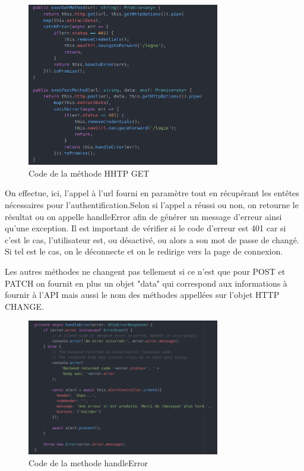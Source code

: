 				\begin{figure}[H]
					\centering\includegraphics[width=0.75\textwidth, keepaspectratio]{res/ionic-rest-execmethod.png}
					\caption{Code de la méthode HHTP GET}
				\end{figure}

				On effectue, ici, l'appel à l'url fourni en paramètre tout en récupérant les entêtes nécessaires pour l'authentification.Selon si l'appel a réussi ou non, on retourne le résultat ou on appelle handleError afin de générer un message d'erreur ainsi qu'une exception. Il est important de vérifier si le code d'erreur est 401 car si c'est le cas, l'utilisateur est, ou désactivé, ou alors a son mot de passe de changé. Si tel est le cas, on le déconnecte et on le redirige vers la page de connexion.

				Les autres méthodes ne changent pas tellement si ce n'est que pour POST et PATCH on fournit en plus un objet "data" qui correspond aux informations à fournir à l'API mais aussi le nom des méthodes appellées sur l'objet HTTP CHANGE.

				\begin{figure}[H]
					\centering\includegraphics[width=0.75\textwidth, keepaspectratio]{res/ionic-rest-error.png}
					\caption{Code de la methode handleError}
				\end{figure}

